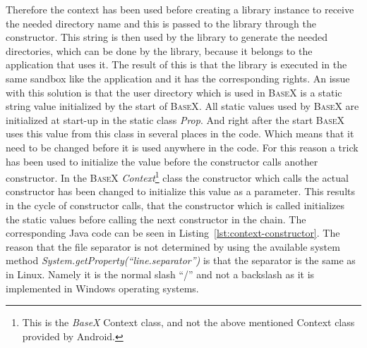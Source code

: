 Therefore the context has been used before creating a library instance to receive the needed directory name and this is passed to the library through the constructor.
This string is then used by the library to generate the needed directories, which can be done by the library, because it belongs to the application that uses it.
The result of this is that the library is executed in the same sandbox like the application and it has the corresponding rights.
An issue with this solution is that the user directory which is used in \textsc{BaseX} is a static string value initialized by the start of \textsc{BaseX}.
All static values used by \textsc{BaseX} are initialized at start-up in the static class \textit{Prop}.
And right after the start \textsc{BaseX} uses this value from this class in several places in the code.
Which means that it need to be changed before it is used anywhere in the code.
For this reason a trick has been used to initialize the value before the constructor calls another constructor.
In the \textsc{BaseX} \textit{Context}\footnote{This is the \textit{BaseX} Context class, and not the above mentioned Context class provided by Android.} class the constructor which calls the actual constructor has been changed to initialize this value as a parameter.
This results in the cycle of constructor calls, that the constructor which is called initializes the static values before calling the next constructor in the chain.
The corresponding Java code can be seen in Listing~\ref{lst:context-constructor}.
The reason that the file separator is not determined by using the available system method \textit{System.getProperty(``line.separator'')} is that the separator is the same as in Linux.
Namely it is the normal slash ``/'' and not a backslash as it is implemented in Windows operating systems.



